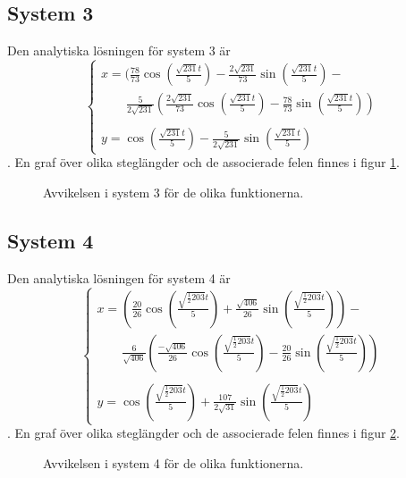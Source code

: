 \subsection{System 3}
Den analytiska lösningen för system 3 är
\begin{equation*}
    \begin{cases}
        x=(\frac{78}{73}\cos(\frac{\sqrt{231}t}{5})-\frac{2\sqrt{231}}{73}\sin(\frac{\sqrt{231}t}{5})-\\
        \qquad \frac{5}{2\sqrt{231}}(\frac{2\sqrt{231}}{73}\cos(\frac{\sqrt{231}t}{5})-\frac{78}{73}\sin(\frac{\sqrt{231}t}{5}))\\
        \\[-7.5pt]
        y=\cos({\frac{\sqrt{231}t}{5}})-\frac{5}{2\sqrt{231}}\sin(\frac{\sqrt{231}t}{5})
    \end{cases}
\end{equation*}. En graf över olika steglängder och de associerade felen finnes i figur \ref{fig:diagram_sys_3_errors}.

\begin{figure}[h!]
    \centering
    
    \caption{Avvikelsen i system 3 för de olika funktionerna.}
    \label{fig:diagram_sys_3_errors}
\end{figure}

\subsection{System 4}
Den analytiska lösningen för system 4 är
\begin{equation*}
    \begin{cases}
        x=(\frac{20}{26}\cos(\frac{\sqrt{\frac{1}{2}203}t}{5})+\frac{\sqrt{406}}{26}\sin(\frac{\sqrt{\frac{1}{2}203}t}{5}))-\\
        \qquad \frac{6}{\sqrt{406}}(\frac{-\sqrt{406}}{26}\cos(\frac{\sqrt{\frac{1}{2}203}t}{5})-\frac{20}{26}\sin(\frac{\sqrt{\frac{1}{2}203}t}{5}))\\
        \\[-7.5pt]
        y=\cos({\frac{\sqrt{\frac{1}{2}203}t}{5}})+\frac{107}{2\sqrt{31}}\sin(\frac{\sqrt{\frac{1}{2}203}t}{5})
    \end{cases}
\end{equation*}. En graf över olika steglängder och de associerade felen finnes i figur \ref{fig:diagram_sys_4_errors}.

\begin{figure}[h!]
    \centering
    
    \caption{Avvikelsen i system 4 för de olika funktionerna.}
    \label{fig:diagram_sys_4_errors}
\end{figure}

